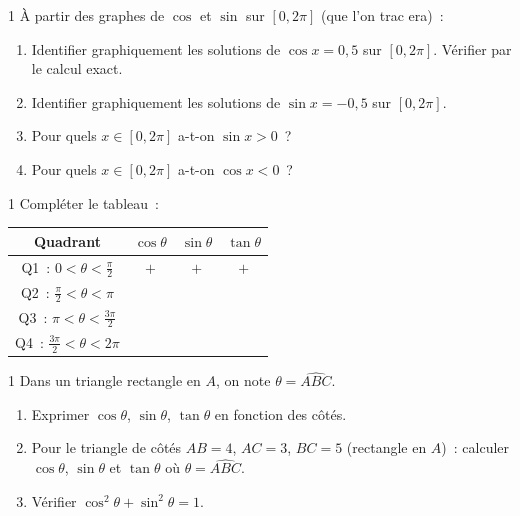\begin{exo}{1}
\`A partir des graphes de $\cos$ et $\sin$ sur $[0,2\pi]$
(que l'on trac era)~:
\begin{enumerate}
  \item Identifier graphiquement les solutions de $\cos x = 0{,}5$
        sur $[0,2\pi]$. V\'erifier par le calcul exact.
  \item Identifier graphiquement les solutions de $\sin x = -0{,}5$
        sur $[0,2\pi]$.
  \item Pour quels $x\in[0,2\pi]$ a-t-on $\sin x > 0$~?
  \item Pour quels $x\in[0,2\pi]$ a-t-on $\cos x < 0$~?
\end{enumerate}
\end{exo}

\begin{exo}{1}
Compl\'eter le tableau~:
\begin{center}
\renewcommand{\arraystretch}{1.4}
\begin{tabular}{|c|c|c|c|}
\hline
\rowcolor{BN!10}
Quadrant & $\cos\theta$ & $\sin\theta$ & $\tan\theta$ \\
\hline
Q1~: $0<\theta<\frac{\pi}{2}$ & $+$ & $+$ & $+$ \\
Q2~: $\frac{\pi}{2}<\theta<\pi$ & & & \\
Q3~: $\pi<\theta<\frac{3\pi}{2}$ & & & \\
Q4~: $\frac{3\pi}{2}<\theta<2\pi$ & & & \\
\hline
\end{tabular}
\end{center}
\end{exo}

\begin{exo}{1}
Dans un triangle rectangle en $A$, on note $\theta = \widehat{ABC}$.
\begin{enumerate}
  \item Exprimer $\cos\theta$, $\sin\theta$, $\tan\theta$ en fonction des c\^ot\'es.
  \item Pour le triangle de c\^ot\'es $AB=4$, $AC=3$, $BC=5$ (rectangle en $A$)~:
        calculer $\cos\theta$, $\sin\theta$ et $\tan\theta$ o\`u $\theta=\widehat{ABC}$.
  \item V\'erifier $\cos^2\theta+\sin^2\theta=1$.
\end{enumerate}
\end{exo}

